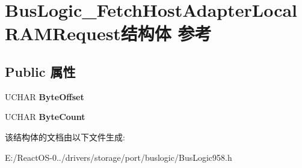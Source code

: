 \hypertarget{struct_bus_logic___fetch_host_adapter_local_r_a_m_request}{}\section{Bus\+Logic\+\_\+\+Fetch\+Host\+Adapter\+Local\+R\+A\+M\+Request结构体 参考}
\label{struct_bus_logic___fetch_host_adapter_local_r_a_m_request}
\subsection*{Public 属性}
\begin{DoxyCompactItemize}
\item 
\mbox{\label{struct_bus_logic___fetch_host_adapter_local_r_a_m_request_a4d0d183cf6b95ed89ff3c42dba80bada}} 
U\+C\+H\+AR {\bfseries Byte\+Offset}
\item 
\mbox{\label{struct_bus_logic___fetch_host_adapter_local_r_a_m_request_a98ac455c060942323b7863ba83f54114}} 
U\+C\+H\+AR {\bfseries Byte\+Count}
\end{DoxyCompactItemize}


该结构体的文档由以下文件生成\+:\begin{DoxyCompactItemize}
\item 
E\+:/\+React\+O\+S-\/0../drivers/storage/port/buslogic/Bus\+Logic958.\+h\end{DoxyCompactItemize}
